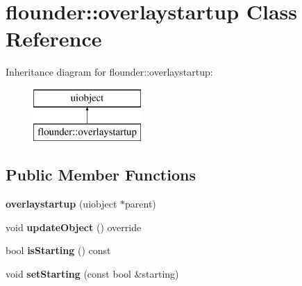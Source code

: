 \hypertarget{classflounder_1_1overlaystartup}{}\section{flounder\+:\+:overlaystartup Class Reference}
\label{classflounder_1_1overlaystartup}
Inheritance diagram for flounder\+:\+:overlaystartup\+:\begin{figure}[H]
\begin{center}
\leavevmode
\includegraphics[height=2.000000cm]{classflounder_1_1overlaystartup}
\end{center}
\end{figure}
\subsection*{Public Member Functions}
\begin{DoxyCompactItemize}
\item 
\mbox{\label{classflounder_1_1overlaystartup_aa4f86142ae511f8c1131203277c36bea}} 
{\bfseries overlaystartup} (uiobject $\ast$parent)
\item 
\mbox{\label{classflounder_1_1overlaystartup_a82c63fc531f43731f7af8ac23ae4e638}} 
void {\bfseries update\+Object} () override
\item 
\mbox{\label{classflounder_1_1overlaystartup_a3db9c52b0bfed2b1ee2fac4906803fe4}} 
bool {\bfseries is\+Starting} () const
\item 
\mbox{\label{classflounder_1_1overlaystartup_a3e7f7141d88a83b5042d71b1fb3364a9}} 
void {\bfseries set\+Starting} (const bool \&starting)
\end{DoxyCompactItemize}
